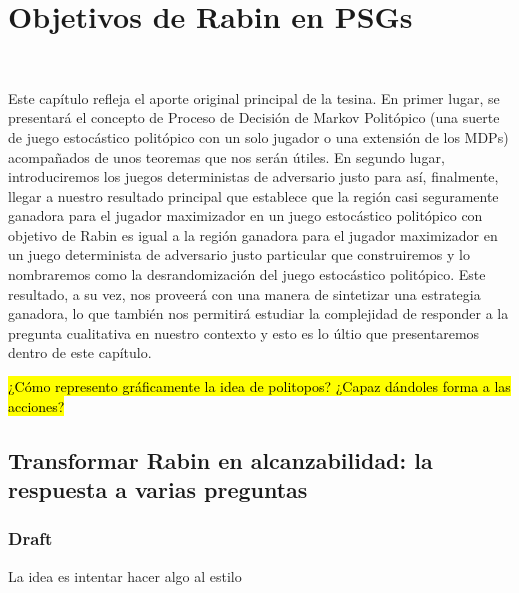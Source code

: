 \chapter{Objetivos de Rabin en PSGs}
~\label{cap:results}

Este capítulo refleja el aporte original principal de la tesina. En primer
lugar, se presentará el concepto de Proceso de Decisión de Markov Politópico
(una suerte de juego estocástico politópico con un solo jugador o una extensión
de los MDPs) acompañados de unos teoremas que nos serán útiles. En segundo
lugar, introduciremos los juegos deterministas de adversario justo para así,
finalmente, llegar a nuestro resultado principal que establece que la región
casi seguramente ganadora para el jugador maximizador en un juego estocástico
politópico con objetivo de Rabin es igual a la región ganadora para el jugador
maximizador en un juego determinista de adversario justo particular que
construiremos y lo nombraremos como la desrandomización del juego estocástico
politópico. Este resultado, a su vez, nos proveerá con una manera de sintetizar
una estrategia ganadora, lo que también nos permitirá estudiar la complejidad
de responder a la pregunta cualitativa en nuestro contexto y esto es lo últio
que presentaremos dentro de este capítulo.





\hl{¿Cómo represento gráficamente la idea de politopos? ¿Capaz dándoles forma a las acciones?}

\section{Transformar Rabin en alcanzabilidad: la respuesta a varias preguntas}

\subsection{Draft}

La idea es intentar hacer algo al estilo

